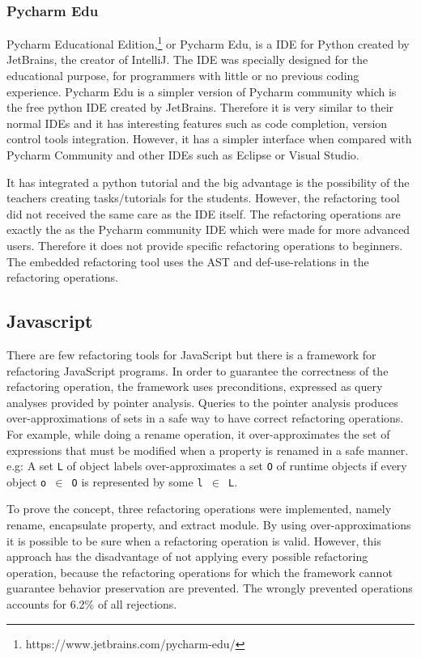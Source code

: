 \subsubsection{Pycharm Edu}
Pycharm Educational Edition,\footnote{https://www.jetbrains.com/pycharm-edu/}
 or Pycharm Edu, is a IDE for Python created by JetBrains,
the creator of IntelliJ.
The IDE was specially designed for the educational purpose, for programmers
with little or no previous coding experience.
Pycharm Edu is a simpler version of Pycharm community which is the free
python IDE created by JetBrains.
Therefore it is very similar to their normal IDEs and it has interesting features
such as code completion, version control tools integration.
However, it has a simpler interface when compared with
Pycharm Community and other IDEs such as Eclipse or Visual Studio. %

It has integrated a python tutorial and the big advantage is the possibility of
the teachers creating tasks/tutorials for the students.
However, the refactoring tool did not received the same care as the IDE itself.
The refactoring operations are exactly the as the Pycharm community IDE which were made
for more advanced users.
Therefore it does not provide specific refactoring operations to beginners.
The embedded refactoring tool uses the AST and def-use-relations in the refactoring
operations.

\subsection{Javascript}
There are few refactoring tools for JavaScript but there is a framework
\cite{feldthaus2011tool} for refactoring JavaScript programs. %
In order to guarantee the correctness of the refactoring operation, the framework
uses preconditions, expressed as query analyses provided by pointer analysis. %
Queries to the pointer analysis produces over-approximations of sets in a safe way to
have correct refactoring operations.
For example, while doing a rename operation, it over-approximates the set of expressions
that must be modified when a property is renamed in a safe manner.
e.g: A set {\tt L} of object labels over-approximates a set {\tt O} of runtime objects if every
object {\tt o $\in$ O} is represented by some {\tt l $\in$ L}.

To prove the concept, three refactoring operations were implemented, namely rename,
encapsulate property, and extract module.
By using over-approximations it is possible to be sure when a refactoring
operation is valid.
However, this approach has the disadvantage of not applying every possible refactoring operation,
because the refactoring operations for which the framework cannot guarantee behavior
preservation are prevented.
The wrongly prevented operations accounts for 6.2\% of all rejections.
